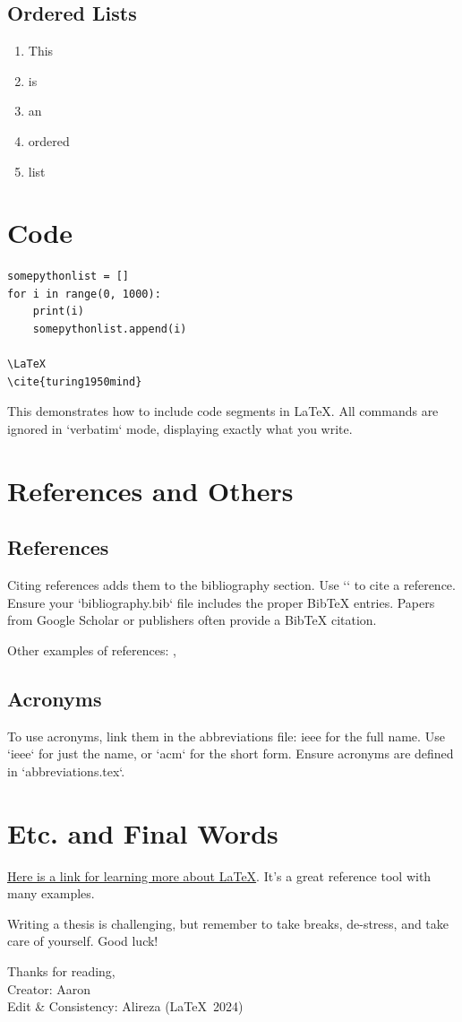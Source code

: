 \subsection{Ordered Lists}
\begin{enumerate}
    \item This
    \item is
    \item an
    \item ordered
    \item list
\end{enumerate}

\section{Code}
\begin{verbatim}
somepythonlist = []
for i in range(0, 1000):
    print(i)
    somepythonlist.append(i)

\LaTeX
\cite{turing1950mind}
\end{verbatim}

This demonstrates how to include code segments in \LaTeX{}. All commands are ignored in `verbatim` mode, displaying exactly what you write.

\section{References and Others}
\subsection{References}
Citing references adds them to the bibliography section. Use `\cite{turing1950mind}` to cite a reference. Ensure your `bibliography.bib` file includes the proper BibTeX entries. Papers from Google Scholar or publishers often provide a BibTeX citation.

Other examples of references:
\cite{hopper1952education}, \cite{hamiltonsoftware}

\subsection{Acronyms}
To use acronyms, link them in the abbreviations file:
\acrfull{ieee} for the full name. Use `\acrlong{ieee}` for just the name, or `\acrshort{acm}` for the short form. Ensure acronyms are defined in `abbreviations.tex`.

\section{Etc. and Final Words}\label{finalwords}
\href{https://www.overleaf.com/learn/latex/Learn_LaTeX_in_30_minutes}{Here is a link for learning more about \LaTeX{}}. It's a great reference tool with many examples. 

Writing a thesis is challenging, but remember to take breaks, de-stress, and take care of yourself. Good luck!

Thanks for reading,\\
Creator: Aaron\\
Edit \& Consistency: Alireza (\LaTeX\ 2024)
